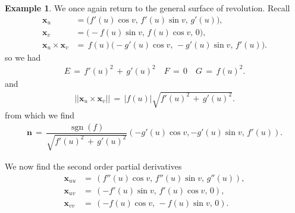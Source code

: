 \documentclass{UKZNcomp}
\newcommand{\vect}[1]{\mathbf{#1}} %
\theoremstyle{definition}
\newtheorem{example}[definition]{Example}
\DeclareMathOperator{\sgn}{sgn}
\theoremstyle{remark}
\begin{document}
\begin{example}
We once again return to the general surface of revolution. Recall
\begin{align*}
\vect x_u &= \big(f'(u)\cos v,\, f'(u)\sin v, \, g'(u)\big),\\
\vect x_v &= \big(-f(u)\sin v,\, f(u)\cos v, \,0\big),\\
\vect x_u\times \vect x_v &=\, f(u)\big(-g'(u)\cos v, \, -g'(u)\sin v,\, f'(u)\big).
\end{align*}
so we had
\begin{align*}
E\,=\,f'(u)^2\,+\,g'(u)^2\quad F\,=\,0\quad G\,=\,f(u)^2.
\end{align*}
and
\begin{align*}
\lvert\lvert\vect x_u \times \vect x_v\rvert\rvert\,=\,\lvert f(u)\rvert\sqrt{f'(u)^2\,+\,g'(u)^2}.
\end{align*}
from which we find
\begin{align*}
\vect n\,=\, \dfrac{\sgn(f)}{\sqrt{f'(u)^2\,+\,g'(u)^2}}(-g'(u)\cos v,-g'(u)\sin v,\,f'(u)).
\end{align*}

We now find the second order partial derivatives
\begin{align*}
\vect x_{uu} &=\,(f''(u)\cos v,\,f''(u)\sin v,\,g''(u)),\\
\vect x_{uv} &=\,(-f'(u)\sin v,\,f'(u)\cos v,\,0),\\
\vect x_{vv} &=\,(-f(u)\cos v,\,-f(u)\sin v,\,0).
\end{align*}


\end{example}
\end{document}
